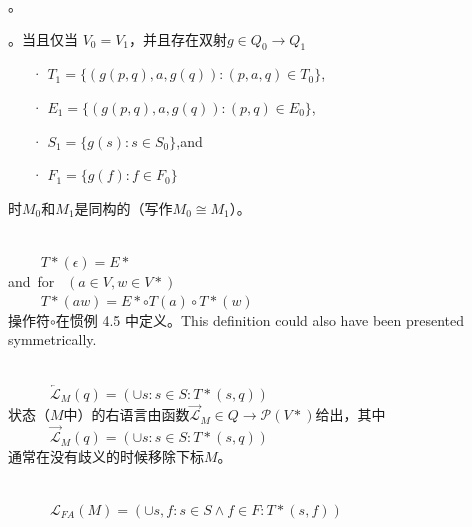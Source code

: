 {{。
\newline

。当且仅当 $V_0=V_1$，并且存在双射$g\in Q_0 \longrightarrow Q_1$ 

\begin{itemize}
    \item[·] $T_1 = \{ (g(p,q),a,g(q)) : (p,a,q) \in T_0 \}$,
    \item[·] $E_1 = \{ (g(p,q),a,g(q)) : (p,q) \in E_0\}$,
    \item[·] $S_1 = \{ g(s):s\in S_0 \}$,and 
    \item[·] $F_1 = \{ g(f):f\in F_0 \}$
\end{itemize}
时$M_0$和$M_1$是同构的（写作$M_0 \cong M_1$）。
\newline

 \\
\mbox{　　} $T*(\epsilon) = E*$ \\
\mbox{and for } $(a\in V,w\in V*)$ \\
\mbox{　　} $ T*(aw) = E* \circ T(a) \circ T*(w) $ \\
操作符$\circ$在惯例 4.5 中定义。This definition could also have been presented symmetrically.
\newline

\newline

 \\
\mbox{　　}　$ \overleftarrow{\mathcal{L}}_M (q) = ( \cup s:s \in S : T*(s,q) ) $ \\
状态（$M$中）的右语言由函数$ \overrightarrow{\mathcal{L}} _M \in Q \longrightarrow \mathcal{P}(V*)$给出，其中 \\
\mbox{　　}　$ \overrightarrow{\mathcal{L}}_M (q) = ( \cup s:s \in S : T*(s,q) ) $ \\
通常在没有歧义的时候移除下标$M$。
\newline

 \\
\mbox{　　}　$ \mathcal{L}_{FA} (M) = (\cup s,f:s \in S \land f \in F : T* (s,f)) $ \\

}}
